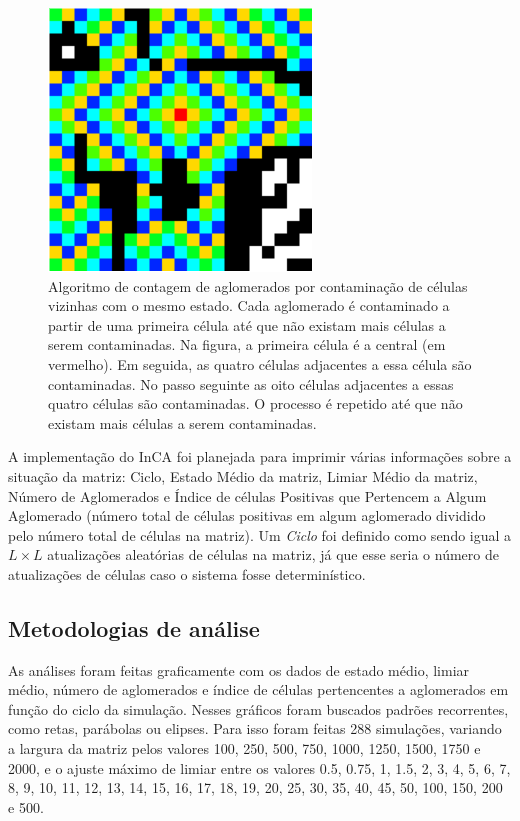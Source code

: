 \documentclass[11pt,a4paper,twocolumn,final]{article}
\begin{document}
\begin{figure}
    \centering
    \includegraphics[width=.7\linewidth]{contamination.png}
    \caption{Algoritmo de contagem de aglomerados por contaminação de células vizinhas com o mesmo estado. Cada aglomerado é contaminado a partir de uma primeira célula até que não existam mais células a serem contaminadas. Na figura, a primeira célula é a central (em vermelho). Em seguida, as quatro células adjacentes a essa célula são contaminadas. No passo seguinte as oito células adjacentes a essas quatro células são contaminadas. O processo é repetido até que não existam mais células a serem contaminadas.}
    \label{fig:contamination}
\end{figure}

A implementação do InCA foi planejada para imprimir várias informações sobre a situação da matriz: Ciclo, Estado Médio da matriz, Limiar Médio da matriz, Número de Aglomerados e Índice de células Positivas que Pertencem a Algum Aglomerado (número total de células positivas em algum aglomerado dividido pelo número total de células na matriz). Um \textit{Ciclo} foi definido como sendo igual a $L\times L$ atualizações aleatórias de células na matriz, já que esse seria o número de atualizações de células caso o sistema fosse determinístico.

\subsection*{Metodologias de análise}

As análises foram feitas graficamente com os dados de estado médio, limiar médio, número de aglomerados e índice de células pertencentes a aglomerados em função do ciclo da simulação. Nesses gráficos foram buscados padrões recorrentes, como retas, parábolas ou elipses. Para isso foram feitas 288 simulações, variando a largura da matriz pelos valores 100, 250,
500,
750,
1000,
1250,
1500,
1750 e
2000, e o ajuste máximo de limiar entre os valores \num{0,5},
\num{0,75},
1,
\num{1,5},
2,
3,
4,
5,
6,
7,
8,
9,
10,
11,
12,
13,
14,
15,
16,
17,
18,
19,
20,
25,
30,
35,
40,
45,
50,
100,
150,
200 e
500.
\end{document}
